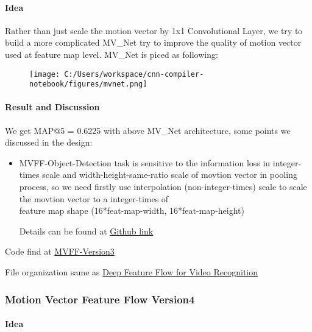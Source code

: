 \documentclass[]{article}
\let\oldparagraph\paragraph
\renewcommand{\paragraph}[1]{\oldparagraph{#1}\mbox{}}
\begin{document}
\hypertarget{header-n1884}{%
\paragraph{Idea}\label{header-n1884}}

Rather than just scale the motion vector by 1x1 Convolutional Layer, we
try to build a more complicated MV\_Net try to improve the quality
of motion vector used at feature map level. MV\_Net is piced as
following:
\newpage
\begin{figure}
\centering
\texttt{[image: C:/Users/workspace/cnn-compiler-notebook/figures/mvnet.png]}
\caption{}
\end{figure}

\hypertarget{header-n1887}{%
\paragraph{Result and Discussion}\label{header-n1887}}

We get MAP@5 = 0.6225 with above MV\_Net architecture, some points we
discussed in the design:

\begin{itemize}
\item
  MVFF-Object-Detection task is sensitive to the information loss in
  integer-times scale and width-height-same-ratio scale of movtion
  vector in pooling process, so we need firstly use interpolation
  (non-integer-times) scale to scale the movtion vector to a
  integer-times of\\
  feature map shape (16*feat-map-width, 16*feat-map-height)

  Details can be found at
  \href{https://github.com/OrdinaryCrazy/cnn-compiler-notebook/blob/master/weekly-report/weeklyreport0819-0825.pdf}{Github
  link}
\end{itemize}

Code find at
\href{https://github.com/OrdinaryCrazy/mvff-sideversions}{MVFF-Version3}

File organization same as
\href{https://github.com/msracver/Deep-Feature-Flow}{Deep Feature Flow
for Video Recognition}

\hypertarget{header-n1895}{%
\subsubsection{Motion Vector Feature Flow Version4}\label{header-n1895}}

\hypertarget{header-n1896}{%
\paragraph{Idea}\label{header-n1896}}
\end{document}
